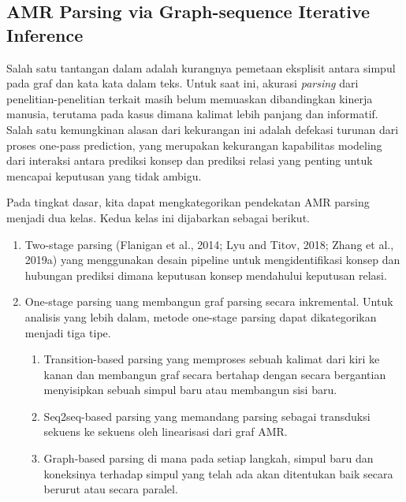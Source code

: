 \subsection{AMR Parsing via Graph-sequence Iterative Inference }

Salah satu tantangan dalam \amrparsing{} adalah kurangnya pemetaan eksplisit antara simpul pada graf dan kata kata dalam teks.
Untuk saat ini, akurasi \textit{parsing} dari penelitian-penelitian terkait masih belum memuaskan dibandingkan kinerja manusia, terutama pada kasus dimana kalimat lebih panjang dan informatif.
Salah satu kemungkinan alasan dari kekurangan ini adalah defekasi turunan dari proses one-pass prediction, yang merupakan kekurangan kapabilitas modeling dari interaksi antara prediksi konsep dan prediksi relasi yang penting untuk mencapai keputusan yang tidak ambigu.

Pada tingkat dasar, kita dapat mengkategorikan pendekatan AMR parsing menjadi dua kelas.
Kedua kelas ini dijabarkan sebagai berikut.
\begin{enumerate}
  \item Two-stage parsing (Flanigan et al., 2014; Lyu and Titov, 2018; Zhang et al., 2019a) yang menggunakan desain pipeline untuk mengidentifikasi konsep dan hubungan prediksi dimana keputusan konsep mendahului keputusan relasi.

  \item One-stage parsing uang membangun graf parsing secara inkremental.
  Untuk analisis yang lebih dalam, metode one-stage parsing dapat dikategorikan menjadi tiga tipe.
  \begin{enumerate}
      \item Transition-based parsing yang memproses sebuah kalimat dari kiri ke kanan dan membangun graf secara bertahap dengan secara bergantian menyisipkan sebuah simpul baru atau membangun sisi baru.

      \item Seq2seq-based parsing yang memandang parsing sebagai transduksi sekuens ke sekuens oleh linearisasi dari graf AMR.

      \item Graph-based parsing di mana pada setiap langkah, simpul baru dan koneksinya terhadap simpul yang telah ada akan ditentukan baik secara berurut atau secara paralel.
  \end{enumerate}
\end{enumerate}

